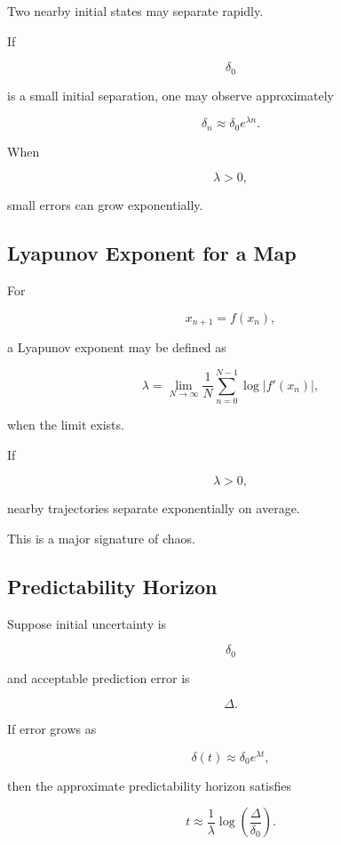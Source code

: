 Two nearby initial states may separate rapidly.

If

\[
\delta_0
\]

is a small initial separation, one may observe approximately

\[
\boxed{
\delta_n
\approx
\delta_0e^{\lambda n}.
}
\]

When

\[
\lambda>0,
\]

small errors can grow exponentially.

\subsection{Lyapunov Exponent for a Map}
\label{subsec:lyapunov-exponent-map}

For

\[
x_{n+1}=f(x_n),
\]

a Lyapunov exponent may be defined as

\[
\boxed{
\lambda
=
\lim_{N\to\infty}
\frac1N
\sum_{n=0}^{N-1}
\log
|
f'(x_n)
|,
}
\]

when the limit exists.

If

\[
\boxed{
\lambda>0,
}
\]

nearby trajectories separate exponentially on average.

This is a major signature of chaos.

\subsection{Predictability Horizon}
\label{subsec:predictability-horizon}

Suppose initial uncertainty is

\[
\delta_0
\]

and acceptable prediction error is

\[
\Delta.
\]

If error grows as

\[
\delta(t)
\approx
\delta_0e^{\lambda t},
\]

then the approximate predictability horizon satisfies

\[
\boxed{
t
\approx
\frac1\lambda
\log
\left(
\frac{\Delta}{\delta_0}
\right).
}
\]

